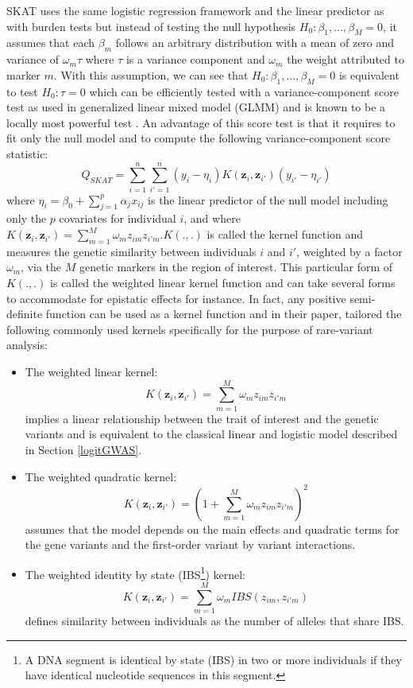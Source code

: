 \documentclass[]{book}
\let\rmarkdownfootnote\footnote%
\def\footnote{\protect\rmarkdownfootnote}
\begin{document}
SKAT uses the same logistic regression framework and the linear
predictor as with burden tests but instead of testing the null
hypothesis \(H_0: \beta_1, \dots, \beta_M = 0\), it assumes that each
\(\beta_m\) follows an arbitrary distribution with a mean of zero and
variance of \(\omega_m \tau\) where \(\tau\) is a variance component and
\(\omega_m\) the weight attributed to marker \(m\). With this assumption, we
can see that \(H_0: \beta_1, \dots, \beta_M = 0\) is equivalent to test
\(H_0: \tau = 0\) which can be efficiently tested with a
variance-component score test as used in generalized linear mixed model
(GLMM) and is known to be a locally most powerful test
\citep{lin1997variance}. An advantage of this score test is that it requires
to fit only the null model and to compute the following
variance-component score statistic:
\[Q_{SKAT} = \sum_{i=1}^n \sum_{i'=1}^n (y_i - \eta_i) K(\mathbf{z}_i,\mathbf{z}_{i'}) (y_{i'} - \eta_{i'})\]
where \(\eta_i = \beta_0 + \sum_{j=1}^p \alpha_j x_{ij}\) is the linear
predictor of the null model including only the \(p\) covariates for
individual \(i\), and where
\(K(\mathbf{z}_{i},\mathbf{z}_{i'}) = \sum_{m=1}^M \omega_m z_{im} z_{i'm}.K(.,.)\)
is called the kernel function and measures the genetic similarity
between individuals \(i\) and \(i'\), weighted by a factor \(\omega_m\), via
the \(M\) genetic markers in the region of interest. This particular form
of \(K(.,.)\) is
called the weighted linear kernel function and can take several forms to
accommodate for epistatic effects for instance. In fact, any positive
semi-definite function can be used as a kernel function and in their
paper, \citep{wu_rare-variant_2011} tailored the following commonly used
kernels specifically for the purpose of rare-variant analysis:

\begin{itemize}
\item
  The weighted linear kernel:
  \[K(\mathbf{z}_{i},\mathbf{z}_{i'}) = \sum_{m=1}^M \omega_m z_{im} z_{i'm}\]
  implies a linear relationship between the trait of interest and the
  genetic variants and is equivalent to the classical linear and
  logistic model described in Section \ref{logitGWAS}.
\item
  The weighted quadratic kernel:
  \[K(\mathbf{z}_{i},\mathbf{z}_{i'}) = (1 + \sum_{m=1}^M \omega_m z_{im} z_{i'm})^2\]
  assumes that the model depends on the main effects and quadratic
  terms for the gene variants and the first-order variant by variant
  interactions.
\item
  The weighted identity by state (IBS\footnote{A DNA segment is identical by state (IBS) in two or more
    individuals if they have identical nucleotide sequences in this
    segment.}) kernel:
  \[K(\mathbf{z}_{i},\mathbf{z}_{i'}) = \sum_{m=1}^M \omega_m IBS(z_{im},z_{i'm})\]
  defines similarity between individuals as the number of alleles that
  share IBS.
\end{itemize}
\end{document}
